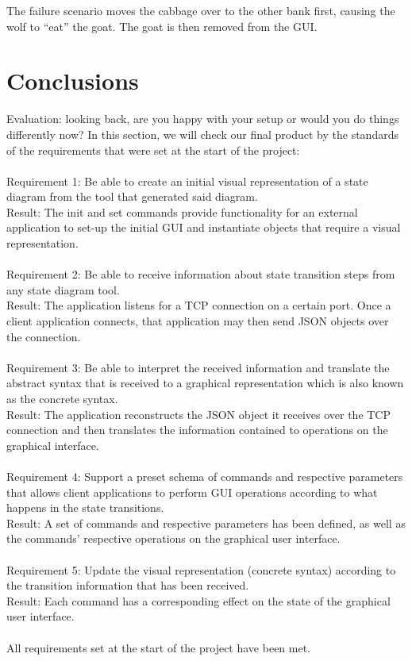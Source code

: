 \documentclass[11pt,a4paper]{article}
\begin{document}
The failure scenario moves the cabbage over to the other bank first, causing the wolf to ``eat'' the goat. The goat is then removed from the GUI.


\section{Conclusions}

Evaluation: looking back, are you happy with your setup or would you do things differently now?
In this section, we will check our final product by the standards of the requirements that were set at the start of the project:
\\\\
Requirement 1: Be able to create an initial visual representation of a state diagram from the tool that generated said diagram.\\
Result: The init and set commands provide functionality for an external application to set-up the initial GUI and instantiate objects that require a visual representation.
\\\\
Requirement 2: Be able to receive information about state transition steps from any state diagram tool.\\
Result: The application listens for a TCP connection on a certain port. Once a client application connects, that application may then send JSON objects over the connection.
\\\\
Requirement 3: Be able to interpret the received information and translate the abstract syntax that is received to a graphical representation which is also known as the concrete syntax.\\
Result: The application reconstructs the JSON object it receives over the TCP connection and then translates the information contained to operations on the graphical interface.
\\\\
Requirement 4: Support a preset schema of commands and respective parameters that allows client applications to perform GUI operations according to what happens in the state transitions.\\
Result: A set of commands and respective parameters has been defined, as well as the commands' respective operations on the graphical user interface.
\\\\
Requirement 5: Update the visual representation (concrete syntax) according to the transition information that has been received.\\
Result: Each command has a corresponding effect on the state of the graphical user interface.
\\\\
All requirements set at the start of the project have been met.
\end{document}
